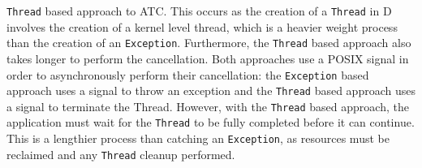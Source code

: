 \texttt{Thread} based approach to ATC. This occurs as the creation of a 
\texttt{Thread} in D involves the creation of a kernel level thread, which is a 
heavier weight process than the creation of an \texttt{Exception}.
Furthermore, the \texttt{Thread} based approach also takes longer to perform
the cancellation. Both approaches use a POSIX signal in order to asynchronously
perform their cancellation: the \texttt{Exception} based approach uses a signal
to throw an exception and the \texttt{Thread} based approach uses a signal to
terminate the Thread. However, with the \texttt{Thread} based approach, the
application must wait for the \texttt{Thread} to be fully completed before it can
continue. This is a lengthier process than catching an
\texttt{Exception}, as resources must be reclaimed and any \texttt{Thread}
cleanup performed. 

